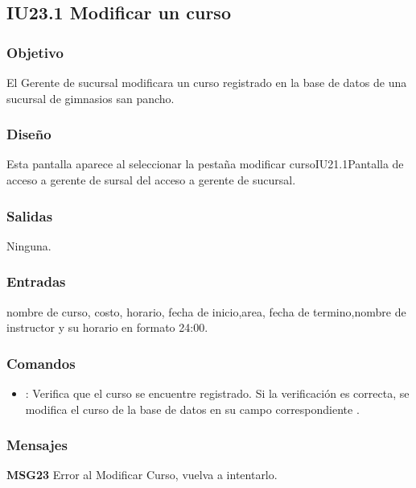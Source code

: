 \subsection{IU23.1 Modificar un curso}

\subsubsection{Objetivo}
	El Gerente de sucursal modificara un curso registrado en la base de datos de una sucursal de gimnasios san pancho.

\subsubsection{Diseño}
	Esta pantalla aparece al seleccionar la pestaña modificar curso{IU21.1}{Pantalla de acceso a gerente de sursal} del acceso a gerente de sucursal. 


\subsubsection{Salidas}

	Ninguna.

\subsubsection{Entradas}
nombre de curso, costo, horario, fecha de inicio,area, fecha de termino,nombre de instructor y su  horario en formato 24:00.

\subsubsection{Comandos}
\begin{itemize}
	\item {}: Verifica que el curso se encuentre registrado. Si la verificación es correcta, se modifica el curso de la base de datos en su campo correspondiente .
\end{itemize}

\subsubsection{Mensajes}
	\begin{Citemize}
		\item {\bf MSG23} Error al Modificar Curso, vuelva a intentarlo.
	\end{Citemize}

